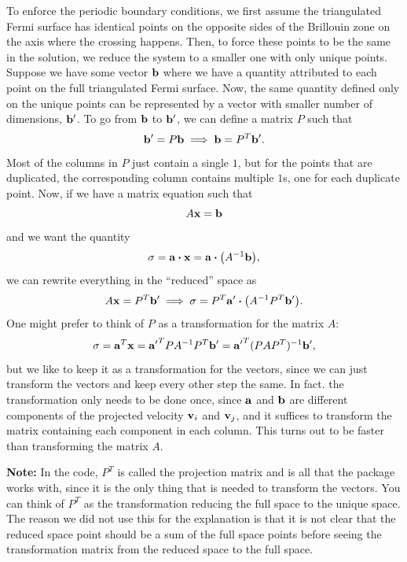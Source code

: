 \documentclass[12pt]{article}
\begin{document}
To enforce the periodic boundary conditions, we first assume the triangulated Fermi surface
has identical points on the opposite sides of the Brillouin zone on the axis where the crossing
happens. Then, to force these points to be the same in the solution, we reduce the system to
a smaller one with only unique points. Suppose we have some vector $\vb{b}$ where we have a
quantity attributed to each point on the full triangulated Fermi surface. Now, the same quantity
defined only on the unique points can be represented by a vector with smaller number of dimensions,
$\vb{b'}$. To go from $\vb{b}$ to $\vb{b'}$, we can define a matrix $P$ such that
\begin{equation}
    \vb{b'} = P\vb{b} \implies \vb{b} = P^T\vb{b'}.
\end{equation}
Most of the columns in $P$ just contain a single $1$, but for the points that are duplicated,
the corresponding column contains multiple $1$s, one for each duplicate point. Now, if we have
a matrix equation such that
\begin{equation}
    A\vb{x} = \vb{b}
\end{equation}
and we want the quantity
\begin{equation}
    \sigma = \vb{a}\vdot\vb{x} = \vb{a}\vdot\qty(A^{-1}\vb{b}),
\end{equation}
we can rewrite everything in the ``reduced'' space as
\begin{equation}
    A\vb{x} = P^T\vb{b'} \implies \sigma = P^T\vb{a'}\vdot\qty(A^{-1}P^T\vb{b'}).
\end{equation}
One might prefer to think of $P$ as a transformation for the matrix $A$:
\begin{equation}
    \sigma = \vb{a}^T\vb{x} = \vb{a'}^T P A^{-1} P^T \vb{b'} = \vb{a'}^T (P A P^T)^{-1} \vb{b'}, 
\end{equation}
but we like to keep it as a transformation for the vectors, since we can just transform the vectors
and keep every other step the same. In fact. the transformation only needs to be done once, since
$\vb{a}$ and $\vb{b}$ are different components of the projected velocity $\vb{v}_i$ and $\vb{v}_j$,
and it suffices to transform the matrix containing each component in each column. This turns out
to be faster than transforming the matrix $A$.

\textbf{Note:} In the code, $P^T$ is called the projection matrix and is all that the package works
with, since it is the only thing that is needed to transform the vectors. You can think of $P^T$
as the transformation reducing the full space to the unique space. The reason we did not use this
for the explanation is that it is not clear that the reduced space point should be a sum of the
full space points before seeing the transformation matrix from the reduced space to the full space.
\end{document}
